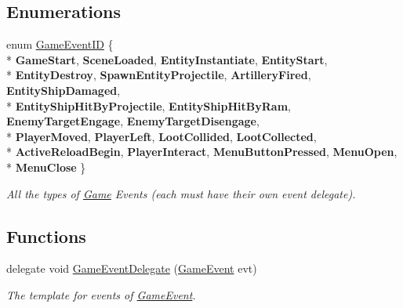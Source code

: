 \subsection*{Enumerations}
\begin{DoxyCompactItemize}
\item 
enum \hyperlink{namespace_skyrates_1_1_game_1_1_event_ad31565d2f03f234f8f77ebf23ff8f150}{Game\-Event\-I\-D} \{ \\*
{\bfseries Game\-Start}, 
{\bfseries Scene\-Loaded}, 
{\bfseries Entity\-Instantiate}, 
{\bfseries Entity\-Start}, 
\\*
{\bfseries Entity\-Destroy}, 
{\bfseries Spawn\-Entity\-Projectile}, 
{\bfseries Artillery\-Fired}, 
{\bfseries Entity\-Ship\-Damaged}, 
\\*
{\bfseries Entity\-Ship\-Hit\-By\-Projectile}, 
{\bfseries Entity\-Ship\-Hit\-By\-Ram}, 
{\bfseries Enemy\-Target\-Engage}, 
{\bfseries Enemy\-Target\-Disengage}, 
\\*
{\bfseries Player\-Moved}, 
{\bfseries Player\-Left}, 
{\bfseries Loot\-Collided}, 
{\bfseries Loot\-Collected}, 
\\*
{\bfseries Active\-Reload\-Begin}, 
{\bfseries Player\-Interact}, 
{\bfseries Menu\-Button\-Pressed}, 
{\bfseries Menu\-Open}, 
\\*
{\bfseries Menu\-Close}
 \}
\begin{DoxyCompactList}\small\item\em All the types of \hyperlink{class_game}{Game} Events (each must have their own event delegate). \end{DoxyCompactList}\end{DoxyCompactItemize}
\subsection*{Functions}
\begin{DoxyCompactItemize}
\item 
delegate void \hyperlink{namespace_skyrates_1_1_game_1_1_event_a06bcdcadb00cfbf4d4ebd1b2e6ad623d}{Game\-Event\-Delegate} (\hyperlink{class_skyrates_1_1_game_1_1_event_1_1_game_event}{Game\-Event} evt)
\begin{DoxyCompactList}\small\item\em The template for events of \hyperlink{class_skyrates_1_1_game_1_1_event_1_1_game_event}{Game\-Event}. \end{DoxyCompactList}\end{DoxyCompactItemize}


